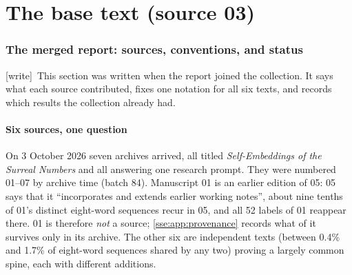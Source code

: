 \documentclass[11pt,a4paper]{article}
\numberwithin{equation}{section}
\theoremstyle{plain}
\theoremstyle{definition}
\theoremstyle{remark}
\newcommand{\wtag}{\textup{\textsf{[write]}}}%
\begin{document}
{\small\setlength{\parskip}{0pt}\tableofcontents}
\newpage

\part{The base text (source 03)}\label{sse:part:base}

\section{The merged report: sources, conventions, and status}\label{sse:sec:merged}

\wtag\ This section was written when the report joined the collection. It
says what each source contributed, fixes one notation for all six texts,
and records which results the collection already had.

\subsection{Six sources, one question}\label{sse:sec:sources}
On 3 October 2026 seven archives arrived, all titled \emph{Self-Embeddings
of the Surreal Numbers} and all answering one research prompt. They were
numbered 01--07 by archive time (batch 84). Manuscript 01 is an earlier
edition of 05: 05 says that it ``incorporates and extends earlier working
notes'', about nine tenths of 01's distinct eight-word sequences recur in
05, and all 52 labels of 01 reappear there. 01 is therefore \emph{not} a
source; \cref{sse:app:provenance} records what of it survives only in its
archive. The other six are independent texts (between 0.4\% and 1.7\% of
eight-word sequences shared by any two) proving a largely common spine,
each with different additions.
\end{document}
